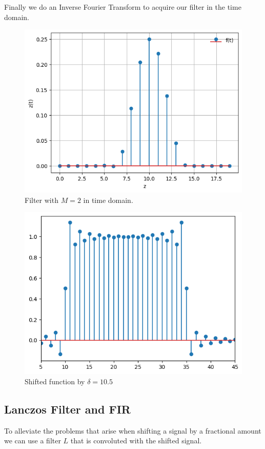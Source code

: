 \documentclass[]{usiinfbachelorproject}
\begin{document}
	
	Finally we do an Inverse Fourier Transform to acquire our filter in the time domain.
	\begin{figure}[h]
		\centering
		\includegraphics[width=0.4\columnwidth]{images/ifft_filter_m_2_25_shift.png}
		\caption{Filter with $M=2$ in time domain.}
		\label{final_filter}
	\end{figure}
	
	
	
%	
	
	\iffalse

	
	\begin{figure}[h]
		\centering
		\includegraphics[width=0.5\columnwidth]{images/box_shifted_delta10_1_n50.png}
		\caption{Shifted function by $\delta=10.5$}
	\end{figure}
	
	\subsection{Lanczos Filter and FIR}
	To alleviate the problems that arise when shifting a signal by a fractional amount we can use a filter $L$ that is convoluted with the shifted signal.
	
\end{document}
